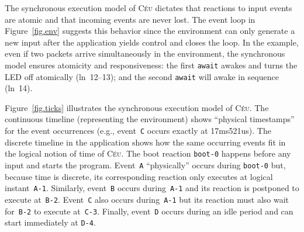 \documentclass[sigplan,10pt,review,anonymous]{acmart}\settopmatter{printfolios=true,printccs=false,printacmref=false}
\newcommand{\CEU}{\textsc{C\'{e}u}\xspace}
\newcommand{\code}[1] {{\small{\texttt{#1}}}}
\begin{document}
The synchronous execution model of \CEU dictates that reactions to input events
are atomic and that incoming events are never lost.
%
The event loop in Figure~\ref{fig.env} suggests this behavior since the
environment can only generate a new input after the application yields control
and closes the loop.
%
In the example, even if two packets arrive simultaneously in the environment,
the synchronous model ensures atomicity and responsiveness:
    the first \code{await} awakes and turns the LED off atomically
    (ln~12--13);
    and the second \code{await} will awake in sequence (ln~14).
%

Figure~\ref{fig.ticks} illustrates the synchronous execution model of \CEU.
%
The continuous timeline (representing the environment) shows
``physical timestamps'' for the event occurrences (e.g., event~\code{C}
occurs exactly at 17ms521us).
%
The discrete timeline in the application shows how the same occurring events
fit in the logical notion of time of \CEU.
%
The boot reaction \code{boot-0} happens before any input and starts the
program.
%
Event~\code{A} ``physically'' occurs during \code{boot-0} but, because time
is discrete, its corresponding reaction only executes at logical
instant~\code{A-1}.
%
Similarly, event~\code{B} occurs during~\code{A-1} and its reaction is
postponed to execute at~\code{B-2}.
%
Event~\code{C} also occurs during~\code{A-1} but its reaction must also wait
for~\code{B-2} to execute at~\code{C-3}.
%
Finally, event~\code{D} occurs during an idle period and can start immediately
at \code{D-4}.
%
\end{document}

